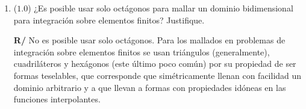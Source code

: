 \documentclass[12pt]{article}
\begin{document}
\begin{enumerate}[leftmargin=*,widest=9]
   \item (\(1.0\)) ¿Es posible usar solo octágonos para mallar un dominio bidimensional para integración sobre elementos finitos? Justifique.
   
  \textbf{R/} No es posible usar solo octágonos. Para los mallados en problemas de integración sobre elementos finitos se usan triángulos (generalmente), cuadriláteros y hexágonos (este último poco común) por su propiedad de ser formas teselables, que corresponde que simétricamente llenan con facilidad un dominio arbitrario y a que llevan a formas con propiedades idóneas en las funciones interpolantes.
  \end{enumerate}

\end{document}
